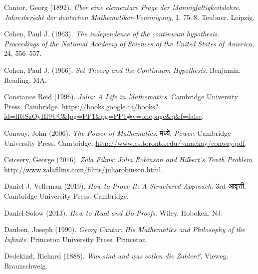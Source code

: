 \par\medskip{}\label{bib:Cantor1892}
Cantor, Georg (1892). \emph{{\"Uber} eine elementare {Frage} der {Mannigfaltigkeitslehre}}. \emph{Jahresbericht der deutschen Mathematiker-Vereinigung}, 1, 75--8. Teubner. Leipzig.

\par\medskip{}\label{bib:Cohen1963}
Cohen, Paul J. (1963). \emph{The independence of the continuum hypothesis}. \emph{Proceedings of the National Academy of Sciences of the United States of America}, 24, 556--557.

\par\medskip{}\label{bib:Cohen1966}
Cohen, Paul J. (1966). \emph{Set Theory and the Continuum Hypothesis}. Benjamin. Reading, MA.

\par\medskip{}\label{bib:Reid1996}
Constance Reid (1996). \emph{Julia: A Life in Mathematics}. Cambridge University Press. Cambridge. \url{https://books.google.ca/books?id=lRtSzQyHf9UC&lpg=PP1&pg=PP1#v=onepage&q&f=false}.

\par\medskip{}\label{bib:Conway2006}
Conway, John (2006). \emph{The Power of Mathematics}. मध्ये: \emph{Power}. Cambridge University Press. Cambridge. \url{http://www.cs.toronto.edu/~mackay/conway.pdf}.

\par\medskip{}\label{bib:Csicsery2016}
Csicsery, George (2016). \emph{Zala Films: {J}ulia {R}obinson and {H}ilbert's Tenth Problem}. \url{http://www.zalafilms.com/films/juliarobinson.html}.

\par\medskip{}\label{bib:Velleman2019}
Daniel J. Velleman (2019). \emph{How to Prove It: A Structured Approach}. 3rd आवृत्ती. Cambridge University Press. Cambridge.

\par\medskip{}\label{bib:Solow2013}
Daniel Solow (2013). \emph{How to Read and Do Proofs}. Wiley. Hoboken, NJ.

\par\medskip{}\label{bib:Dauben1990}
Dauben, Joseph (1990). \emph{{G}eorg {C}antor: {H}is {M}athematics and {P}hilosophy of the {I}nfinite}. Princeton University Press. Princeton.

\par\medskip{}\label{bib:Dedekind1888}
Dedekind, Richard (1888). \emph{Was sind und was sollen die {Zahlen}?}. Vieweg. Braunschweig.

